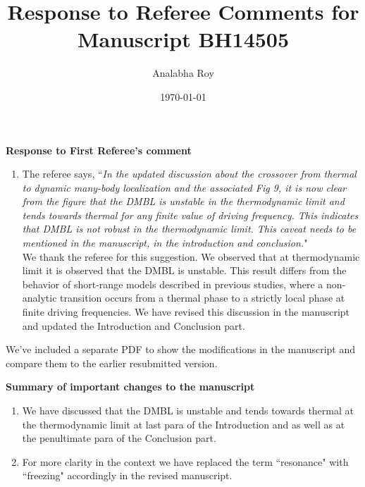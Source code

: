 \documentclass[aps,prb,reprint,showpacs,floatfix,superscriptaddress, onecolumn, nofootinbib, 10pt]{revtex4-2}
\newcommand{\response}[1]{{\color{black}#1}} %
\newcommand{\comment}[1]{{\color{blue}#1}} %
\begin{document}
	
	\title{Response to Referee Comments for Manuscript BH14505}
	\author{Analabha Roy}
	\date{\today}
	
	\maketitle
	
	\vspace{1em}
	
	\noindent \textbf{Response to First Referee's comment}
	
	\begin{enumerate}
		\item The referee says, \comment{``\textit{In the updated discussion about the crossover from thermal to dynamic many-body localization and the associated Fig 9, it is now clear from the figure that the DMBL is unstable in the thermodynamic limit and tends towards thermal for any finite value of driving frequency. This indicates that DMBL is not robust in the thermodynamic limit. This caveat needs to be mentioned in the manuscript, in the introduction	and conclusion.}"}\\
		
		\response{
			We thank the referee for this suggestion. 
			We observed that at thermodynamic limit it is observed that the DMBL is unstable. This result differs from the behavior of short-range models described in previous studies, where a non-analytic transition occurs from a thermal phase to a strictly local phase at finite driving frequencies. We have revised this discussion in the manuscript and updated the Introduction and Conclusion part.
		}
	\end{enumerate}

	We've included a separate PDF to show the modifications in the manuscript and compare them to the earlier resubmitted version.
	
	\vspace{1cm}
	
	\noindent \textbf{Summary of important changes to the  manuscript}
	\begin{enumerate}
		\item We have discussed that the DMBL is unstable and tends towards thermal at the thermodynamic limit at last para of the Introduction and as well as at the penultimate para of the Conclusion part.
		\item For more clarity in the context we have replaced the term ``resonance" with ``freezing" accordingly in the revised manuscript.
	\end{enumerate}
	
\end{document}
